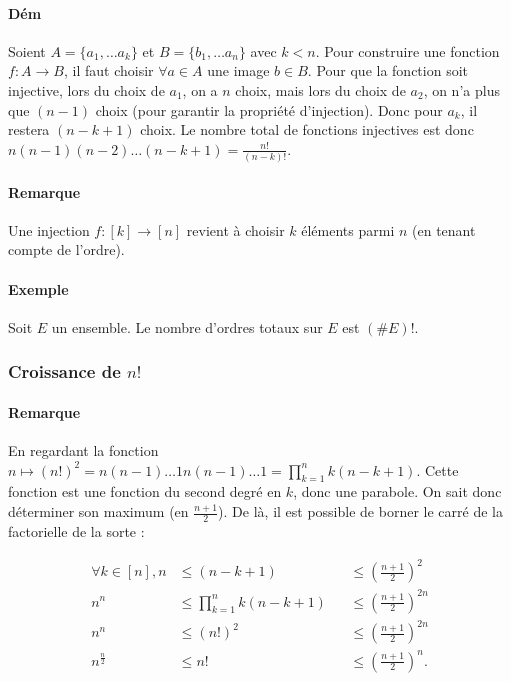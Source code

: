 \documentclass{article}
\begin{document}
			\paragraph{Dém} Soient $A = \{a_1, \ldots a_k\}$ et $B = \{b_1, \ldots a_n\}$ avec $k < n$. Pour construire une fonction $f : A \to B$, il faut
			choisir $\forall a \in A$ une image $b \in B$. Pour que la fonction soit injective, lors du choix de $a_1$, on a $n$ choix, mais lors du choix de $a_2$,
			on n'a plus que $(n-1)$ choix (pour garantir la propriété d'injection). Donc pour $a_k$, il restera $(n-k+1)$ choix. Le nombre total de fonctions injectives
			est donc $n(n-1)(n-2)\ldots(n-k+1) = \frac {n!}{(n-k)!}$.
			
			\paragraph{Remarque} Une injection $f : [k] \to [n]$ revient à choisir $k$ éléments parmi $n$ (en tenant compte de l'ordre).
			
			\paragraph{Exemple} Soit $E$ un ensemble. Le nombre d'ordres totaux sur $E$ est $(\#E)!$.
			
			\subsubsection{Croissance de $n!$}
			
			\paragraph{Remarque} En regardant la fonction $n \mapsto (n!)^2 = n(n-1)\ldots 1n(n-1)\ldots 1 = \prod_{k=1}^nk(n-k+1)$.
			Cette fonction est une fonction du second degré en $k$, donc une parabole. On sait donc déterminer son maximum (en $\frac {n+1}2$). De là, il est possible
			de borner le carré de la factorielle de la sorte :
			
			\[\begin{aligned}
				\forall k \in [n], n &\leq (n-k+1) &&\leq \left(\frac {n+1}2\right)^2 \\
								   n^n &\leq \prod_{k=1}^nk(n-k+1) &&\leq \left(\frac {n+1}2\right)^{2n} \\
								   n^n &\leq (n!)^2 &&\leq \left(\frac {n+1}2\right)^{2n} \\
								   n^{\frac n2} &\leq n! &&\leq \left(\frac {n+1}2\right)^n.
			\end{aligned}\]
			
\end{document}
